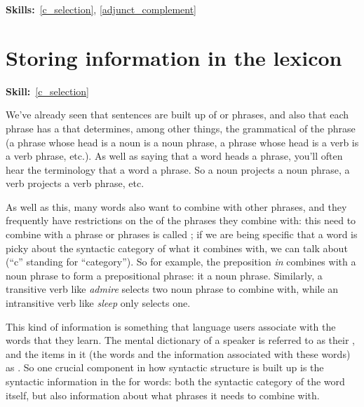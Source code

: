 \documentclass{article}
\begin{document}
\maketitle
\subtitle{Topic 4 Course Notes: Predicates and Arguments Part 2\\
Arguments, Modifiers and Subjects}
\hfill{}\textbf{Skills:}~\ref{c_selection},
\ref{adjunct_complement}

\section{Storing information in the lexicon}
\hfill{}\textbf{Skill:}~\ref{c_selection}

We've already seen that sentences are built up of  or phrases, and also that each phrase has a  that determines, among other things, the grammatical  of the phrase (a phrase whose head is a noun is a noun phrase, a phrase whose head is a verb is a verb phrase, etc.).
As well as saying that a word heads a phrase, you'll often hear the terminology that a word  a phrase.  So a noun projects a noun phrase, a verb projects a verb phrase, etc.

As well as this, many words also want to combine with other phrases, and they frequently have restrictions on the  of the phrases they combine with: this need to combine with a phrase or phrases is called ; if we are being specific that a word is picky about the syntactic category of what it combines with, we can talk about  (``c'' standing for ``category'').
So for example,  the preposition \emph{in} combines with a noun phrase to form a prepositional phrase: it  a noun phrase.
Similarly, a transitive verb like \emph{admire} selects two noun phrase to combine with, while an intransitive verb like \emph{sleep} only selects one.  

This kind of information is something that language users associate with the words that they learn.
The mental dictionary of a speaker is referred to as their , and the items in it (the words and the information associated with these words) as .
So one crucial component in how syntactic structure is built up is the syntactic information in the  for words: both the syntactic category of the word itself, but also information about what phrases it needs to combine with. 
\end{document}
